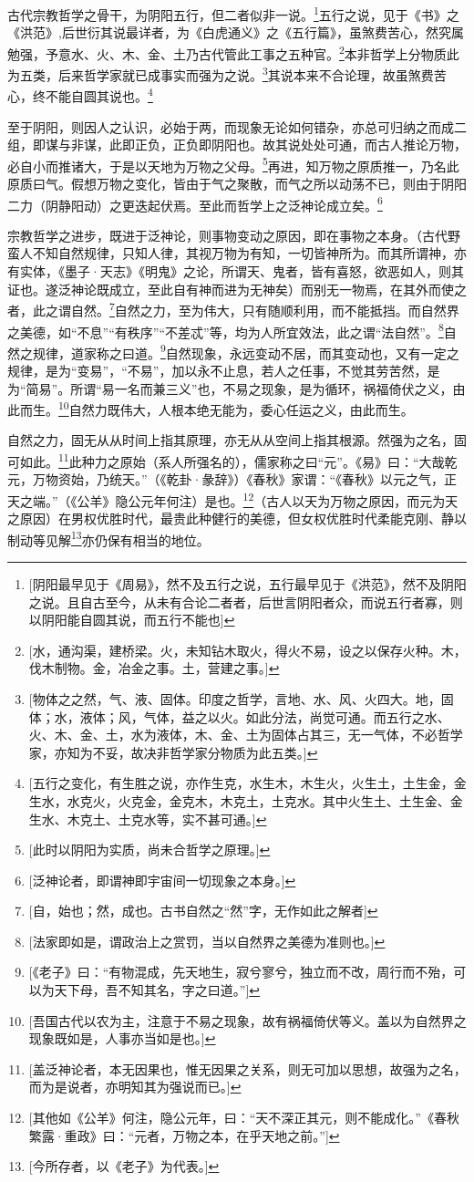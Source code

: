 古代宗教哲学之骨干，为阴阳五行，但二者似非一说。\footnote{[阴阳最早见于《周易》，然不及五行之说，五行最早见于《洪范》，然不及阴阳之说。且自古至今，从未有合论二者者，后世言阴阳者众，而说五行者寡，则以阴阳能自圆其说，而五行不能也]}五行之说，见于《书》之《洪范》,后世衍其说最详者，为《白虎通义》之《五行篇》，虽煞费苦心，然究属勉强，予意水、火、木、金、土乃古代管此工事之五种官。\footnote{[水，通沟渠，建桥梁。火，未知钻木取火，得火不易，设之以保存火种。木，伐木制物。金，冶金之事。土，营建之事。]}本非哲学上分物质此为五类，后来哲学家就已成事实而强为之说。\footnote{[物体之之然，气、液、固体。印度之哲学，言地、水、风、火四大。地，固体；水，液体；风，气体，益之以火。如此分法，尚觉可通。而五行之水、火、木、金、土，水为液体，木、金、土为固体占其三，无一气体，不必哲学家，亦知为不妥，故决非哲学家分物质为此五类。]}其说本来不合论理，故虽煞费苦心，终不能自圆其说也。\footnote{[五行之变化，有生胜之说，亦作生克，水生木，木生火，火生土，土生金，金生水，水克火，火克金，金克木，木克土，土克水。其中火生土、土生金、金生水、木克土、土克水等，实不甚可通。]}

至于阴阳，则因人之认识，必始于两，而现象无论如何错杂，亦总可归纳之而成二组，即谋与非谋，此即正负，正负即阴阳也。故其说处处可通，而古人推论万物，必自小而推诸大，于是以天地为万物之父母。\footnote{[此时以阴阳为实质，尚未合哲学之原理。]}再进，知万物之原质推一，乃名此原质曰气。假想万物之变化，皆由于气之聚散，而气之所以动荡不已，则由于阴阳二力（阴静阳动）之更迭起伏焉。至此而哲学上之泛神论成立矣。\footnote{[泛神论者，即谓神即宇宙间一切现象之本身。]}

宗教哲学之进步，既进于泛神论，则事物变动之原因，即在事物之本身。（古代野蛮人不知自然规律，只知人律，其视万物为有知，一切皆神所为。而其所谓神，亦有实体，《墨子·天志》《明鬼》之论，所谓天、鬼者，皆有喜怒，欲恶如人，则其证也。遂泛神论既成立，至此自有神而进为无神矣）而别无一物焉，在其外而使之者，此之谓自然。\footnote{[自，始也；然，成也。古书自然之“然”字，无作如此之解者]}自然之力，至为伟大，只有随顺利用，而不能抵挡。而自然界之美德，如“不息”“有秩序”“不差忒”等，均为人所宜效法，此之谓“法自然”。\footnote{[法家即如是，谓政治上之赏罚，当以自然界之美德为准则也。]}自然之规律，道家称之曰道。\footnote{[《老子》曰：“有物混成，先天地生，寂兮寥兮，独立而不改，周行而不殆，可以为天下母，吾不知其名，字之曰道。”]}自然现象，永远变动不居，而其变动也，又有一定之规律，是为“变易”，“不易”，加以永不止息，若人之任事，不觉其劳苦然，是为“简易”。所谓“易一名而兼三义”也，不易之现象，是为循环，祸福倚伏之义，由此而生。\footnote{[吾国古代以农为主，注意于不易之现象，故有祸福倚伏等义。盖以为自然界之现象既如是，人事亦当如是也。]}自然力既伟大，人根本绝无能为，委心任运之义，由此而生。

自然之力，固无从从时间上指其原理，亦无从从空间上指其根源。然强为之名，固可如此。\footnote{[盖泛神论者，本无因果也，惟无因果之关系，则无可加以思想，故强为之名，而为是说者，亦明知其为强说而已。]}此种力之原始（系人所强名的），儒家称之曰“元”。《易》曰：“大哉乾元，万物资始，乃统天。”（《乾卦·彖辞》）《春秋》家谓：“《春秋》以元之气，正天之端。”（《公羊》隐公元年何注）是也。\footnote{[其他如《公羊》何注，隐公元年，曰：“天不深正其元，则不能成化。”《春秋繁露·重政》曰：“元者，万物之本，在乎天地之前。”]}（古人以天为万物之原因，而元为天之原因）在男权优胜时代，最贵此种健行的美德，但女权优胜时代柔能克刚、静以制动等见解\footnote{[今所存者，以《老子》为代表。]}亦仍保有相当的地位。
